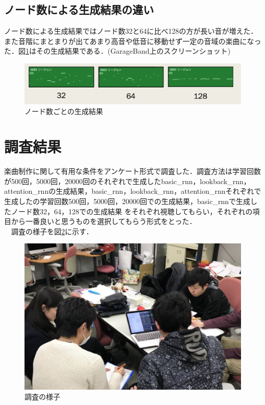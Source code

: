 \subsection{ノード数による生成結果の違い}
ノード数による生成結果ではノード数32と64に比べ128の方が長い音が増えた．また音階にまとまりが出てあまり高音や低音に移動せず一定の音域の楽曲になった．図\ref{fig:ノード数ごとの生成結果}はその生成結果である．(GarageBand上のスクリーンショット)
\begin{figure}[h]
    \begin{screen}
    \begin{center}
        \includegraphics[scale=0.68, clip]{./img/nodo.png}
        \caption{ノード数ごとの生成結果}
        \label{fig:ノード数ごとの生成結果}
    \end{center}
    \end{screen}
\end{figure}
\newpage
\section{調査結果}
楽曲制作に関して有用な条件をアンケート形式で調査した．調査方法は学習回数が500回，5000回，20000回のそれぞれで生成したbasic\_rnn，lookback\_rnn，attention\_rnnの生成結果，basic\_rnn，lookback\_rnn，attention\_rnnそれぞれで生成したの学習回数500回，5000回，20000回での生成結果，basic\_rnnで生成したノード数32，64，128での生成結果
をそれぞれ視聴してもらい，それぞれの項目から一番良いと思うものを選択してもらう形式をとった．\\
　調査の様子を図\ref{fig:調査の様子}に示す．
\begin{figure}[h]
    \begin{screen}
    \begin{center}
        \includegraphics[scale=0.8, clip]{./img/tyousa1.png}
        \caption{調査の様子}
        \label{fig:調査の様子}
    \end{center}
    \end{screen}
\end{figure}
\newpage
